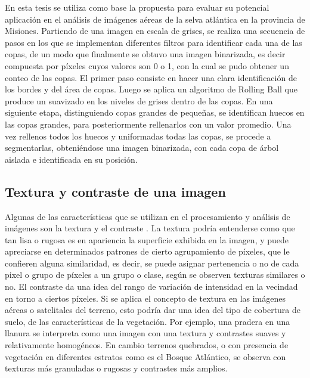 En esta tesis se utiliza como base la propuesta \cite{ferreira_tree_2019} para evaluar su potencial aplicación en el análisis de imágenes aéreas de la selva atlántica en la provincia de Misiones.
Partiendo de una imagen en escala de grises, se realiza una secuencia de pasos en los que se implementan diferentes filtros para identificar cada una de las copas, de un modo que finalmente se obtuvo una imagen binarizada, es decir compuesta por píxeles cuyos valores son 0 o 1, con la cual se pudo obtener un conteo de las copas. El primer paso consiste en hacer una clara identificación de los bordes y del área de copas. Luego se aplica un algoritmo de Rolling Ball \cite{sternberg_biomedical_1983} que produce un suavizado en los niveles de grises dentro de las copas. En una siguiente etapa, distinguiendo copas grandes de pequeñas, se identifican huecos en las copas grandes, para posteriormente rellenarlos con un valor promedio. Una vez rellenos todos los huecos y uniformadas todas las copas, se procede a segmentarlas, obteniéndose una imagen binarizada, con cada copa de árbol aislada e identificada en su posición. 

\subsection{Textura y contraste de una imagen}
Algunas de las características que se utilizan en el procesamiento y análisis de imágenes son la textura y el contraste \cite{armi}. La textura podría entenderse como que tan lisa o rugosa es en apariencia la superficie exhibida en la imagen, y puede apreciarse en determinados patrones de cierto agrupamiento de píxeles, que le confieren alguna similaridad, es decir, se puede asignar pertenencia o no de cada pixel o grupo de píxeles a un grupo o clase, según se observen texturas similares o no. El contraste da una idea del rango de variación de intensidad en la vecindad en torno a ciertos píxeles. Si se aplica el concepto de textura en las imágenes aéreas o satelitales del terreno, esto podría dar una idea del tipo de cobertura de suelo, de las características de la vegetación. Por ejemplo, una pradera en una llanura se interpreta como una imagen con una textura y contrastes suaves y relativamente homogéneos. En cambio terrenos quebrados, o con presencia de vegetación en diferentes estratos como es el Bosque Atlántico, se observa con texturas más granuladas o rugosas y contrastes más amplios.
